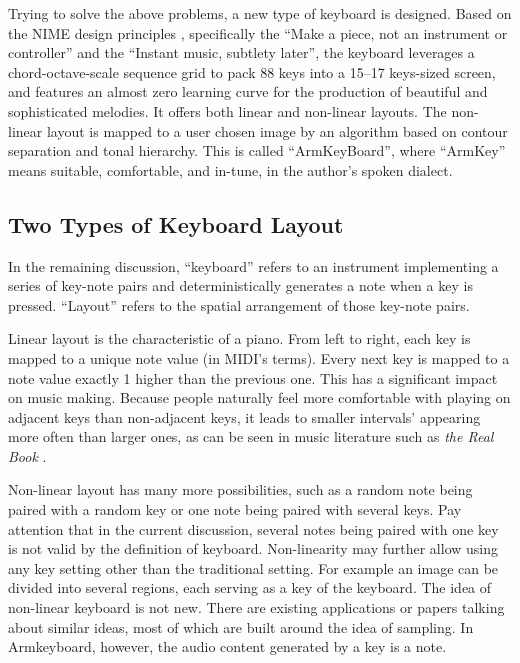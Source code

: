 Trying to solve the above problems, a new type of keyboard is designed. Based on the NIME design principles \cite{cook2001principles}, specifically the ``Make a piece, not an instrument or controller'' and the ``Instant music, subtlety later'', the keyboard leverages a chord-octave-scale sequence grid to pack 88 keys into a 15--17 keys-sized screen, and features an almost zero learning curve for the production of beautiful and sophisticated melodies. It offers both linear and non-linear layouts. The non-linear layout is mapped to a user chosen image by an algorithm based on contour separation and tonal hierarchy. This is called ``ArmKeyBoard'', where ``ArmKey'' means suitable, comfortable, and in-tune, in the author's spoken dialect.

\subsection{Two Types of Keyboard Layout}
In the remaining discussion, ``keyboard'' refers to an instrument implementing a series of key-note pairs and deterministically
generates a note when a key is pressed. ``Layout'' refers to the spatial arrangement of those key-note pairs.

Linear layout is the characteristic of a piano. From left to right, each key is mapped to a unique note value (in MIDI's terms). Every next key is mapped to
a note value exactly 1 higher than the previous one. This has a significant impact on music making. Because people naturally feel more comfortable with playing on adjacent keys than non-adjacent keys, it leads to smaller intervals' appearing more often than larger ones, as can be seen in music literature such as \textit{the Real Book} \cite{therealbook6th}.

Non-linear layout has many more possibilities, such as a random note being paired with a random key or one note being paired with several keys. Pay attention that in the current discussion, several notes being paired with one key is not valid by the definition of keyboard. Non-linearity may further allow using any key setting other than the traditional setting. For example an image can be divided into several regions, each serving as a key of the keyboard. The idea of non-linear keyboard is not new. There are existing applications \cite{kontakts} or papers \cite{kruge2011madpad} talking about similar ideas, most of which are built around the idea of sampling. In Armkeyboard, however, the audio content generated by a key is a note.

